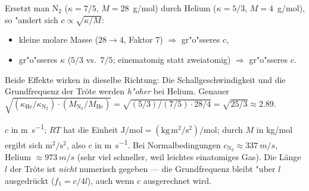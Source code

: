 \begin{werkzeugkasten}
Ersetzt man N$_2$ ($\kappa=7/5$, $M=28$~g/mol) durch Helium
($\kappa=5/3$, $M=4$~g/mol), so "andert sich $c\propto\sqrt{\kappa/M}$:
  \begin{itemize}
  \item kleine molare Masse ($28\to4$, Faktor 7) $\Rightarrow$ gr"o"sseres $c$,
  \item gr"o"sseres $\kappa$ ($5/3$ vs.\ $7/5$; einematomig statt zweiatomig)
        $\Rightarrow$ gr"o"sseres $c$.
  \end{itemize}
Beide Effekte wirken in dieselbe Richtung: Die Schallgeschwindigkeit und die
Grundfrequenz der Tröte werden \emph{h"oher} bei Helium. Genauer
$\sqrt{(\kappa_{\mathrm{He}}/\kappa_{\mathrm{N}_2})\cdot(M_{\mathrm{N}_2}/
M_{\mathrm{He}})}=\sqrt{(5/3)/(7/5)\cdot28/4}=\sqrt{25/3}\approx2.89$.
\end{werkzeugkasten}

\begin{achtung}
$c$ in \unit{\metre\per\second}; $RT$ hat die Einheit
$\mathrm{J/mol}=(\mathrm{kg\,m^2/s^2})/\mathrm{mol}$; durch $M$ in
\unit{kg/mol} ergibt sich $\mathrm{m^2/s^2}$, also $c$ in \unit{\metre\per\second}. 
Bei Normalbedingungen $c_{\mathrm{N}_2}\approx\qty{337}{m/s}$, Helium
$\approx\qty{973}{m/s}$ (sehr viel schneller, weil leichtes einatomiges Gas).
Die Länge $l$ der Tröte ist \emph{nicht} numerisch gegeben --- die
Grundfrequenz bleibt "uber $l$ ausgedrückt ($f_1=c/4l$), auch wenn $c$
ausgerechnet wird.
\end{achtung}
